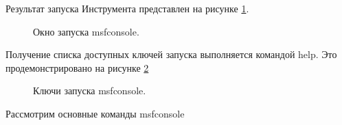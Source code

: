 \documentclass[10pt,a4paper]{report}
\begin{document}
Результат запуска Инструмента представлен на рисунке \ref{Img:1}.

\begin{figure}[h!]	
	\caption{Окно запуска msfconsole.}
	\label{Img:1}
\end{figure}
\pagebreak

Получение списка доступных ключей запуска выполняется командой help. Это продемонстрировано на рисунке \ref{Img:2}

\begin{figure}[h!]	
	\caption{Ключи запуска msfconsole.}
	\label{Img:2}
\end{figure}

Рассмотрим основные команды msfconsole
\end{document}
